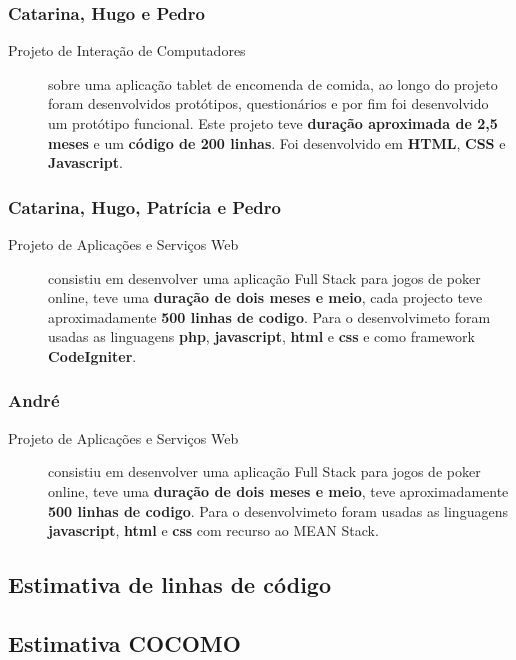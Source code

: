 \documentclass[a4paper]{report}
\begin{document}
\subsubsection*{Catarina, Hugo e Pedro} 
\begin{description}
    \item[Projeto de Interação de Computadores] sobre uma aplicação tablet de encomenda de comida, ao longo do projeto foram desenvolvidos protótipos, questionários e por fim foi desenvolvido um protótipo funcional. Este projeto teve \textbf{duração aproximada de 2,5 meses} e um \textbf{código de 200 linhas}. Foi desenvolvido em \textbf{HTML}, \textbf{CSS} e \textbf{Javascript}.
\end{description}

\subsubsection*{Catarina, Hugo, Patrícia e Pedro}
\begin{description}
    \item[Projeto de Aplicações e Serviços Web] consistiu em desenvolver uma aplicação Full Stack para jogos de poker online, teve uma \textbf{duração de dois meses e meio}, cada projecto teve aproximadamente \textbf{500 linhas de codigo}. Para o desenvolvimeto foram usadas as linguagens \textbf{php}, \textbf{javascript}, \textbf{html} e \textbf{css} e como framework \textbf{CodeIgniter}.
\end{description}

\subsubsection*{André}
\begin{description}
    \item[Projeto de Aplicações e Serviços Web] consistiu em desenvolver uma aplicação Full Stack para jogos de poker online, teve uma \textbf{duração de dois meses e meio}, teve aproximadamente \textbf{500 linhas de codigo}. Para o desenvolvimeto foram usadas as linguagens \textbf{javascript}, \textbf{html} e \textbf{css} com recurso ao MEAN Stack.
\end{description}

\subsection{Estimativa de linhas de código}
\subsection{Estimativa COCOMO}
\end{document}

